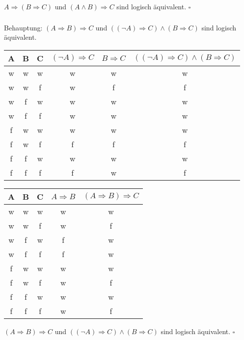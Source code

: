 \documentclass{article}
\begin{document}
$A\Rightarrow (B\Rightarrow C)$ und $(A\land B)\Rightarrow C$ sind logisch äquivalent.
$\square{}$

\subsubsection{}
Behauptung: $(A\Rightarrow B)\Rightarrow C$ und $((\lnot{A})\Rightarrow C)\land (B\Rightarrow C)$ sind logisch äquivalent.

\begin{center}
    \begin{tabular}{|c|c|c|c|c|c|}
        \hline
        A & B & C & $(\lnot A)\Rightarrow C$ & $B\Rightarrow C$ & $((\lnot A)\Rightarrow C)\land(B\Rightarrow C)$ \\
        \hline
        w & w & w & w & w & w \\
        w & w & f & w & f & f \\
        w & f & w & w & w & w \\
        w & f & f & w & w & w \\
        f & w & w & w & w & w \\
        f & w & f & f & f & f \\
        f & f & w & w & w & w \\
        f & f & f & f & w & f \\
        \hline
    \end{tabular}
\end{center}

\begin{center}
    \begin{tabular}{|c|c|c|c|c|}
        \hline
        A & B & C & $A\Rightarrow B$ & $(A\Rightarrow B)\Rightarrow C$ \\
        \hline
        w & w & w & w & w \\
        w & w & f & w & f \\
        w & f & w & f & w \\
        w & f & f & f & w \\
        f & w & w & w & w \\
        f & w & f & w & f \\
        f & f & w & w & w \\
        f & f & f & w & f \\
        \hline
    \end{tabular}
\end{center}
$(A\Rightarrow B)\Rightarrow C$ und $((\lnot{A})\Rightarrow C)\land (B\Rightarrow C)$ sind logisch äquivalent.
$\square{}$
\end{document}
